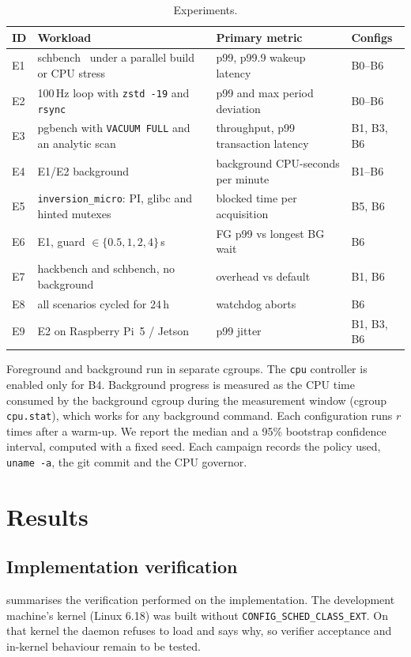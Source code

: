\documentclass[11pt,a4paper]{article}
\newcommand{\code}[1]{\texttt{#1}}
\begin{document}
\begin{table}[h]
\centering\small
\caption{Experiments.}
\label{tab:experiments}
\begin{tabularx}{\linewidth}{@{}llXl@{}}
\toprule
ID & Workload & Primary metric & Configs \\
\midrule
E1 & schbench~\cite{schbench} under a parallel build or CPU stress & p99, p99.9 wakeup latency & B0--B6 \\
E2 & 100\,Hz loop with \code{zstd -19} and \code{rsync} & p99 and max period deviation & B0--B6 \\
E3 & pgbench with \code{VACUUM FULL} and an analytic scan & throughput, p99 transaction latency & B1, B3, B6 \\
E4 & E1/E2 background & background CPU-seconds per minute & B1--B6 \\
E5 & \code{inversion\_micro}: PI, glibc and hinted mutexes & blocked time per acquisition & B5, B6 \\
E6 & E1, guard $\in\{0.5,1,2,4\}$\,s & FG p99 vs longest BG wait & B6 \\
E7 & hackbench and schbench, no background & overhead vs default & B1, B6 \\
E8 & all scenarios cycled for 24\,h & watchdog aborts & B6 \\
E9 & E2 on Raspberry Pi~5 / Jetson & p99 jitter & B1, B3, B6 \\
\bottomrule
\end{tabularx}
\end{table}

Foreground and background run in separate cgroups. The \code{cpu} controller
is enabled only for B4. Background progress is measured as the CPU time
consumed by the background cgroup during the measurement window (cgroup
\code{cpu.stat}), which works for any background command. Each configuration
runs $r$ times after a warm-up. We report the median and a 95\% bootstrap
confidence interval, computed with a fixed seed. Each campaign records the
policy used, \code{uname -a}, the git commit and the CPU governor.

\section{Results}
\label{sec:results}

\subsection{Implementation verification}
 summarises the verification performed on the
implementation. The development machine's kernel (Linux 6.18) was built
without \code{CONFIG\_SCHED\_CLASS\_EXT}. On that kernel the daemon refuses to
load and says why, so verifier acceptance and in-kernel behaviour remain to be
tested.
\end{document}

